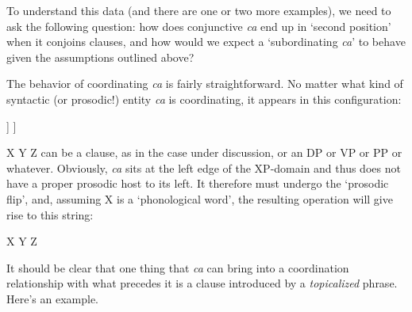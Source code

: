 \documentclass[output=paper,
modfonts
]{LSP/langsci}
\begin{document}
\noindent To understand this data (and there are one or two more examples), we need to ask the following question: how does
conjunctive \textit{ca} end up in `second position' when it conjoins clauses, and how would we expect a `subordinating
\textit{ca}' to behave given the assumptions outlined above?

The behavior of coordinating \textit{ca} is fairly straightforward. No matter what kind of syntactic (or prosodic!)
entity \textit{ca} is coordinating,
it appears in this configuration:

\begin{exe}
\ex\begin{forest}
	[XP
		[\textit{ca}]
		[XP
			[{X Y Z}, roof]
		]
	]
\end{forest}
\end{exe}


\noindent {\ob}X Y Z{\cb} can be a clause, as in the case under discussion, or an DP or VP or PP or whatever. Obviously, \textit{ca} sits
at the left edge of the XP-domain and thus does not have a proper prosodic host to its left. It therefore must undergo
the `prosodic flip', and, assuming X is a `phonological word', the resulting operation will give rise to this
string:

\begin{exe}
	\ex
{\textcolor{gray}{{}} X {}} Y Z 
%
\end{exe}

\noindent It should be clear that one thing that \textit{ca} can bring into a coordination relationship with what precedes it
is a clause introduced by a \textit{topicalized} phrase. Here's an example.

\end{document}
